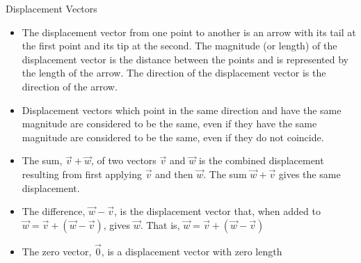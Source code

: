 \documentclass[12pt,letterpaper, onecolumn]{exam}
\begin{document}
		 Displacement Vectors
		\begin{itemize}
			\item The displacement vector from one point to another is an arrow with its tail at the first point and its tip at the second. The magnitude (or length) of the displacement vector is the distance between the points and is represented by the length of the arrow. The direction of the displacement vector is the direction of the arrow.
			\item Displacement vectors which point in the same direction and have the same magnitude are considered to be the same, even if they have the same magnitude are considered to be the same, even if they do not coincide.
			\item The sum, $\vec{v}+\vec{w}$, of two vectors $\vec{v}$ and $\vec{w}$ is the combined displacement resulting from first applying $\vec{v}$ and then $\vec{w}$. The sum $\vec{w}+\vec{v}$ gives the same displacement.
			\item The difference, $\vec{w}-\vec{v}$, is the displacement vector that, when added to $\vec{w}=\vec{v}+(\vec{w}-\vec{v})$, gives $\vec{w}$. That is, $\vec{w}=\vec{v}+(\vec{w}-\vec{v})$
			\item The zero vector, $\vec{0}$, is a displacement vector with zero length
		\end{itemize}
\end{document}
